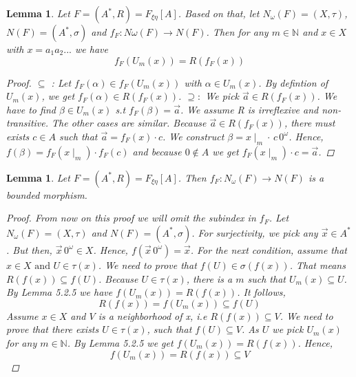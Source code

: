 \documentclass[12pt, a4paper]{scrartcl}
\newtheorem{lemma}[definition]{Lemma}
\begin{document}
\begin{lemma}
    Let $F = (A^*, R) = F_{\xi \eta}[A]$. Based on that, let $N_\omega(F) = (X,\tau)$, $N(F) = (A^*, \sigma)$ and $f_F : N\omega(F) \rightarrow N(F)$.
    Then for any $m \in \mathbb{N}$ and $x\in X$ with $x = a_1a_2...$ \newline we have $$f_F(U_m(x)) = R(f_F(x))$$
    \vspace{0.01cm}
    \begin{proof}
            $\subseteq$ : Let $f_F(\alpha) \in f_F(U_m(x))$ with $\alpha \in U_m(x)$. By defintion of $U_m(x)$,
            we get $f_F(\alpha) \in R(f_F(x))$. \newline \newline
            $\supseteq :$ We pick $\vec{a} \in R(f_F(x))$. We have to find $\beta \in U_m(x)$ s.t $f_F(\beta) = \vec{a}$. We assume R is irreflexive and non-transitive.
            The other cases are similar. \newline
            Because $\vec{a} \in R(f_F(x))$, there must exists $c \in A$ such that $ \vec{a} = f_F(x) \cdot c $.
            We construct $\beta = x \mid_m \cdot \, c\, 0^\omega$. Hence, $f(\beta) = f_F(x \mid_m) \cdot f_F(c)$ and because $ 0 \notin A$ we get $f_F(x \mid_m) \cdot c = \vec{a}$.
            
    \end{proof}
\end{lemma}

\begin{lemma}
    Let $F =(A^*,R) = F_{\xi \eta}[A]$. Then $f_F : N_\omega(F) \rightarrow N(F)$ is a bounded morphism.

    \begin{proof}
        From now on this proof we will omit the subindex in $f_F$.
        Let $N_\omega(F) = (X, \tau)$ and $N(F) =(A^*, \sigma)$. \newline For surjectivity, we pick any $\vec{x} \in A^*$. But then, $\vec{x}\,0^\omega \in X$. Hence, $f(\vec{x}\, 0^\omega) = \vec{x}$. \newline 
        For the next condition, assume that $x \in X \mbox{ and } U \in \tau(x)$. We need to prove that $f(U) \in \sigma(f(x))$. That means $R(f(x)) \subseteq f(U)$. Because $U \in \tau(x)$, there is a $m$ such that
        $U_m(x) \subseteq U$. By Lemma 5.2.5 we have $f(U_m(x)) = R(f(x))$. It follows, 
        $$R(f(x)) = f(U_m(x)) \subseteq f(U)$$ 
        \newline
        Assume $x\in X$ and $V$ is a neighborhood of x, i.e $R(f(x)) \subseteq V$. We need to prove that there exists $U \in \tau(x)$, such that $f(U)\subseteq V$.
        As $U$ we pick $U_m(x)$ for any $m \in \mathbb{N}$. By Lemma 5.2.5 we get $f(U_m(x)) = R(f(x))$. Hence, 
        $$f(U_m(x)) = R(f(x)) \subseteq V$$

    \end{proof} 
\end{lemma}
\end{document}
